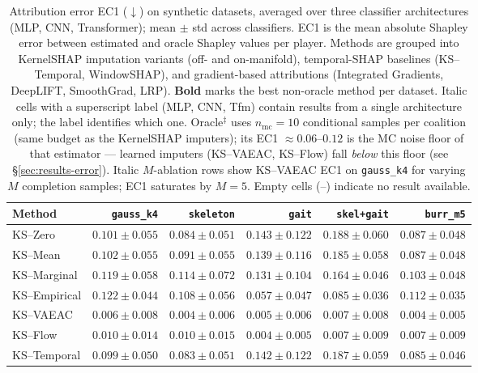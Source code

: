 \begin{table}[t]
\centering\small
\caption{Attribution error EC1 ($\downarrow$) on synthetic datasets, averaged over three classifier architectures (MLP, CNN, Transformer); mean $\pm$ std across classifiers.  EC1 is the mean absolute Shapley error \citep{aas2021explaining,olsen2022using} between estimated and oracle Shapley values per player.  Methods are grouped into KernelSHAP imputation variants (off- and on-manifold), temporal-SHAP baselines (KS--Temporal, WindowSHAP), and gradient-based attributions (Integrated Gradients, DeepLIFT, SmoothGrad, LRP).  \textbf{Bold} marks the best non-oracle method per dataset.  Italic cells with a superscript label (MLP, CNN, Tfm) contain results from a single architecture only; the label identifies which one.  Oracle$^{\ddagger}$ uses $n_\text{mc}{=}10$ conditional samples per coalition (same budget as the KernelSHAP imputers); its EC1 $\approx 0.06$--$0.12$ is the MC noise floor of that estimator --- learned imputers (KS--VAEAC, KS--Flow) fall \emph{below} this floor (see \S\ref{sec:results-error}).  Italic $M$-ablation rows show KS--VAEAC EC1 on \texttt{gauss\_k4} for varying $M$ completion samples; EC1 saturates by $M{=}5$.  Empty cells (--) indicate no result available.}
\label{tab:synth_ec1}
\begin{tabular}{lrrrrr}
\toprule
Method & \texttt{gauss\_k4} & \texttt{skeleton} & \texttt{gait} & \texttt{skel+gait} & \texttt{burr\_m5} \\
\midrule
KS--Zero & $0.101\!\pm\!0.055$ & $0.084\!\pm\!0.051$ & $0.143\!\pm\!0.122$ & $0.188\!\pm\!0.060$ & $0.087\!\pm\!0.048$ \\
KS--Mean & $0.102\!\pm\!0.055$ & $0.091\!\pm\!0.055$ & $0.139\!\pm\!0.116$ & $0.185\!\pm\!0.058$ & $0.087\!\pm\!0.048$ \\
KS--Marginal & $0.119\!\pm\!0.058$ & $0.114\!\pm\!0.072$ & $0.131\!\pm\!0.104$ & $0.164\!\pm\!0.046$ & $0.103\!\pm\!0.048$ \\
KS--Empirical & $0.122\!\pm\!0.044$ & $0.108\!\pm\!0.056$ & $0.057\!\pm\!0.047$ & $0.085\!\pm\!0.036$ & $0.112\!\pm\!0.035$ \\
KS--VAEAC & \textbf{$0.006\!\pm\!0.008$} & \textbf{$0.004\!\pm\!0.006$} & $0.005\!\pm\!0.006$ & \textbf{$0.007\!\pm\!0.008$} & \textbf{$0.004\!\pm\!0.005$} \\
KS--Flow & $0.010\!\pm\!0.014$ & $0.010\!\pm\!0.015$ & \textbf{$0.004\!\pm\!0.005$} & $0.007\!\pm\!0.009$ & $0.007\!\pm\!0.009$ \\
\midrule
KS--Temporal & $0.099\!\pm\!0.050$ & $0.083\!\pm\!0.051$ & $0.142\!\pm\!0.122$ & $0.187\!\pm\!0.059$ & $0.085\!\pm\!0.046$ \\

\end{tabular}
\end{table}
